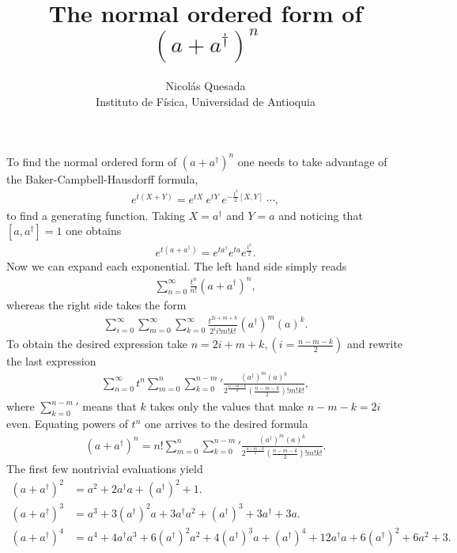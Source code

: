 \documentclass[11pt,letterpaper]{article}
\date{}
\title{The normal ordered form of $(a+a^{\dagger})^n$}
\author{Nicol\'as Quesada\\{\small \sf Instituto de F\'isica, Universidad de Antioquia}}
\begin{document}
\maketitle
\thispagestyle{empty}

To find the normal ordered form of $(a+a^{\dagger})^n$ one needs to take advantage 
of the  Baker-Campbell-Hausdorff formula,
\begin{align}
e^{t(X+Y)}= e^{tX}~  e^{tY} ~e^{-\frac{t^2}{2} [X,Y]} ~ \cdots,
\end{align}
to find a generating function. Taking $X=a^{\dagger}$ and $Y=a$ and noticing that $[a,a^{\dagger}]=1$ one obtains
\begin{align}
e^{t(a+a^{\dagger})}=e^{ t a^{\dagger}} e^{t a} e^{\frac{t^2}{2}}.
\end{align}
Now we can expand each exponential. The left hand side simply reads
\begin{align}
\sum_{n=0}^{\infty}\frac{t^n}{n!}\left(a+a^{\dagger} \right)^n,
\end{align}
whereas the right side takes the form
\begin{align}
 \sum_{i=0}^{\infty} \sum_{m=0}^{\infty}  \sum_{k=0}^{\infty} \frac{t^{2i+m+k}}{2^i i! m! k!} (a^{\dagger})^m (a)^k.
\end{align}
To obtain the desired expression take $n=2i+m+k, (i=\frac{n-m-k}{2})$ and rewrite the last expression
\begin{align}
\sum_{n=0}^{\infty} t^n \sum_{m=0}^n  {\sum_{k=0}^{n-m}}{'} \frac{(a^{\dagger})^m (a)^k}{2^{\frac{n-m-k}{2}}\left(\frac{n-m-k}{2}\right)! m! k! },
\end{align}
where ${\sum_{k=0}^{n-m}}{'}$ means that $k$ takes only the values that make $n-m-k=2 i$ even. Equating
powers of $t^n$ one arrives to the desired formula
\begin{align}
\left(a+a^{\dagger} \right)^n = n! \sum_{m=0}^n  {\sum_{k=0}^{n-m}}{'} \frac{(a^{\dagger})^m (a)^k}{2^{\frac{n-m-k}{2}}\left(\frac{n-m-k}{2}\right)! m! k! }.
\end{align}
The first few nontrivial evaluations yield
\begin{subequations}
\begin{align}
\left(a+a^{\dagger} \right)^2 &=  a^2 +2 a^{\dagger}a+\left(a^{\dagger }\right)^2+1. \\
\left(a+a^{\dagger} \right)^3 &= a^3+3 \left(a^{\dagger
   }\right)^2 a +3 a^{\dagger}a^2+\left(a^{\dagger }\right)^3+3 a^{\dagger } +3 a .\\
\left(a+a^{\dagger} \right)^4 &= a^4+4 a^{\dagger }a^3+6 \left(a^{\dagger }\right)^2 a^2+4\left(a^{\dagger }\right)^3 a+\left(a^{\dagger }\right)^4+12 a^{\dagger}a+6\left(a^{\dagger }\right)^2+6 a^2+3.
\end{align}
\end{subequations}
\end{document}
